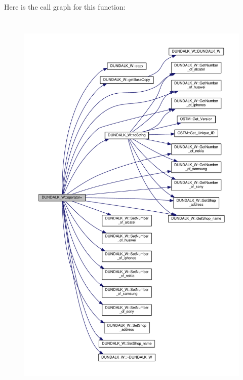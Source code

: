 Here is the call graph for this function\+:\nopagebreak
\begin{figure}[H]
\begin{center}
\leavevmode
\includegraphics[height=550pt]{class_d_u_n_d_a_l_k___w_a63e33d9aa73d944f92928e90566874b9_a63e33d9aa73d944f92928e90566874b9_cgraph}
\end{center}
\end{figure}


